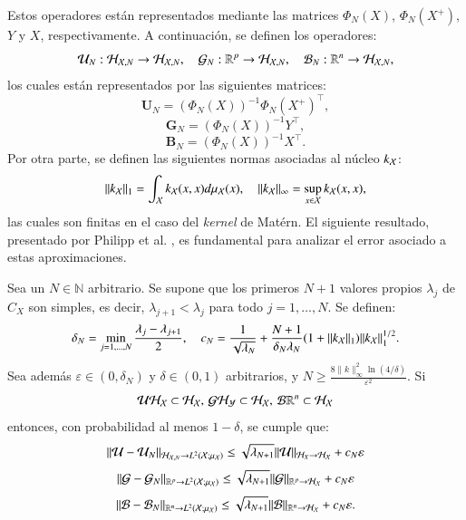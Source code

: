 Estos operadores están representados mediante las matrices \( \Phi_N (X) \), \( \Phi_N (X^+) \), \( Y \) y \( X \), respectivamente. A continuación, se definen los operadores:
\begin{equation*}
    \mathcal{U}_N : \mathcal{H}_{\mathcal{X}, N} \to \mathcal{H}_{\mathcal{X}, N}, \quad \mathcal{G}_N : \mathbb{R}^p \to \mathcal{H}_{\mathcal{X}, N}, \quad \mathcal{B}_N : \mathbb{R}^n \to \mathcal{H}_{\mathcal{X}, N},
\end{equation*}
los cuales están representados por las siguientes matrices:
\begin{equation*}
    \mathbf{U}_N = (\Phi_N (X))^{-1} \Phi_N (X^+)^\top,
\end{equation*}
\begin{equation*}
    \mathbf{G}_N = (\Phi_N (X))^{-1} Y^\top,
\end{equation*}
\begin{equation*}
    \mathbf{B}_N = (\Phi_N (X))^{-1} X^\top.
\end{equation*}
Por otra parte, se definen las siguientes normas asociadas al núcleo \( k_{\mathcal{X}} \):
\begin{equation*}
    \| k_{\mathcal{X}} \|_1 = \int_{\mathcal{X}} k_{\mathcal{X}} (x,x) d \mu_{\mathcal{X}} (x), \quad \| k_{\mathcal{X}} \|_\infty = \sup_{x \in \mathcal{X}} k_{\mathcal{X}} (x,x),
\end{equation*}
las cuales son finitas en el caso del \textit{kernel} de Matérn.
El siguiente resultado, presentado por Philipp et al. \cite{Philipp2024ErrorOperator}, es fundamental para analizar el error asociado a estas aproximaciones.
\begin{teo}
    Sea un \( N \in \mathbb{N} \) arbitrario. Se supone que los primeros \( N + 1 \) valores propios \( \lambda_j \) de \( C_X \) son simples, es decir, \( \lambda_{j+1} < \lambda_j \) para todo \( j = 1, \ldots, N \). Se definen:
    \[
    \delta_N = \min_{j=1, \ldots, N} \frac{\lambda_j - \lambda_{j+1}}{2}, \quad c_N = \frac{1}{\sqrt{\lambda_N}} + \frac{N + 1}{\delta_N \lambda_N} (1 + \|k_{\mathcal{X}}\|_{1}) \|k_{\mathcal{X}} \|^{1/2}_{1}.
    \]
    Sea además \( \varepsilon \in (0, \delta_N) \) y \( \delta \in (0, 1) \) arbitrarios, y \( N \geq  \frac{8\|k\|^2_\infty \ln(4/\delta)}{\varepsilon^2} \). Si 
    \begin{equation*}
        \mathcal{U} \mathcal{H}_{\mathcal{X}} \subset \mathcal{H}_{\mathcal{X}}, \, \mathcal{G} \mathcal{H}_{\mathcal{Y}} \subset \mathcal{H}_{\mathcal{X}}, \, \mathcal{B} \mathbb{R}^n \subset \mathcal{H}_{\mathcal{X}}
    \end{equation*}
    entonces, con probabilidad al menos \( 1 - \delta \), se cumple que:
    \[
    \|\mathcal{U} - \mathcal{U}_N \|_{\mathcal{H}_{\mathcal{X}, N} \to L^2(\mathcal{X}; \mu_{\mathcal{X}})} \leq \sqrt{\lambda_{N+1}} \|\mathcal{U} \|_{\mathcal{H}_{X} \to \mathcal{H_{\mathcal{X}}}} + c_N \varepsilon
    \]
    \[
    \|\mathcal{G} - \mathcal{G}_N \|_{\mathbb{R}^p \to L^2(\mathcal{X}; \mu_{\mathcal{X}})} \leq \sqrt{\lambda_{N+1}} \|\mathcal{G} \|_{\mathbb{R}^p \to \mathcal{H_{\mathcal{X}}}} + c_N \varepsilon
    \]
    \[
    \|\mathcal{B} - \mathcal{B}_N \|_{\mathbb{R}^n \to L^2(\mathcal{X}; \mu_{\mathcal{X}})} \leq \sqrt{\lambda_{N+1}} \|\mathcal{B} \|_{\mathbb{R}^n \to \mathcal{H_{\mathcal{X}}}} + c_N \varepsilon.
    \]
    \label{teo:error_koop}
\end{teo}

